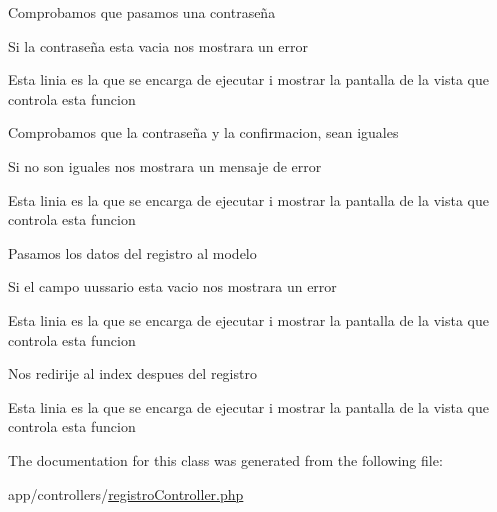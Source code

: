 Comprobamos que pasamos una contraseña

Si la contraseña esta vacia nos mostrara un error

Esta linia es la que se encarga de ejecutar i mostrar la pantalla de la vista que controla esta funcion

Comprobamos que la contraseña y la confirmacion, sean iguales

Si no son iguales nos mostrara un mensaje de error

Esta linia es la que se encarga de ejecutar i mostrar la pantalla de la vista que controla esta funcion

Pasamos los datos del registro al modelo

Si el campo uussario esta vacio nos mostrara un error

Esta linia es la que se encarga de ejecutar i mostrar la pantalla de la vista que controla esta funcion

Nos redirije al index despues del registro

Esta linia es la que se encarga de ejecutar i mostrar la pantalla de la vista que controla esta funcion 

The documentation for this class was generated from the following file\+:\begin{DoxyCompactItemize}
\item 
app/controllers/\hyperlink{registro_controller_8php}{registro\+Controller.\+php}\end{DoxyCompactItemize}
